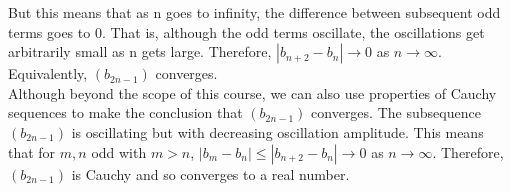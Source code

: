 \documentclass[a4paper]{article}
\begin{document}
\begin{enumerate}
But this means that as n goes to infinity, the difference between subsequent odd terms goes to 0. That is, although the odd terms oscillate, the oscillations get arbitrarily small as n gets large. Therefore, $|b_{n+2} - b_n| \rightarrow 0$ as $n \rightarrow \infty$. Equivalently, $(b_{2n-1})$ converges. \\

Although beyond the scope of this course, we can also use properties of Cauchy sequences to make the conclusion that $(b_{2n-1})$ converges. The subsequence $(b_{2n-1})$ is oscillating but with decreasing oscillation amplitude. This means that for $m,n$ odd with $m > n$, $|b_m - b_n| \leq |b_{n+2} - b_{n}| \rightarrow 0$ as $n \rightarrow \infty$. Therefore, $(b_{2n-1})$ is Cauchy and so converges to a real number. 

\end{enumerate}
\end{document}
